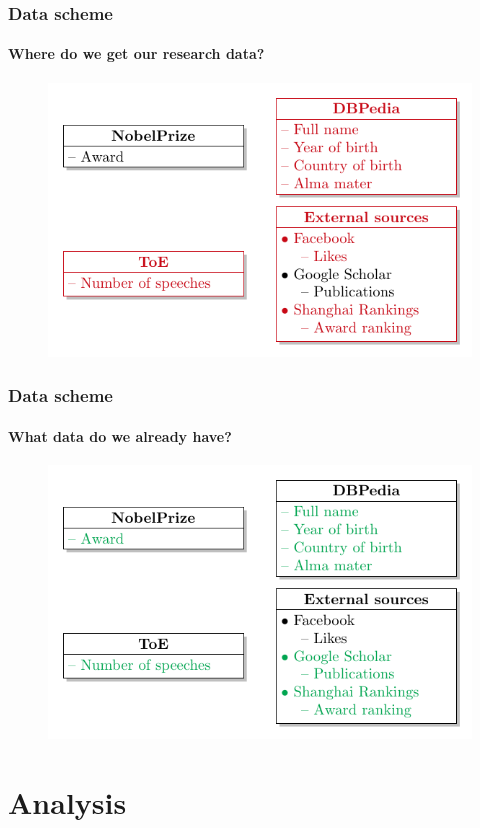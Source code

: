 \documentclass[nonav,sleutel]{beamer}
\begin{document}
\begin{frame}
\frametitle{Data scheme}
\framesubtitle{Where do we get our \textbf{\textcolor{Red7}{research}} data?}
\begin{figure}
	\includegraphics{images/dataschema_research}
\end{figure}
\end{frame}

\begin{frame}
\frametitle{Data scheme}
\framesubtitle{What data do we \textbf{\textcolor{Green7}{already have}}?}
\begin{figure}
	\includegraphics{images/dataschema_done}
\end{figure}
\end{frame}

\section{Analysis}
\end{document}

